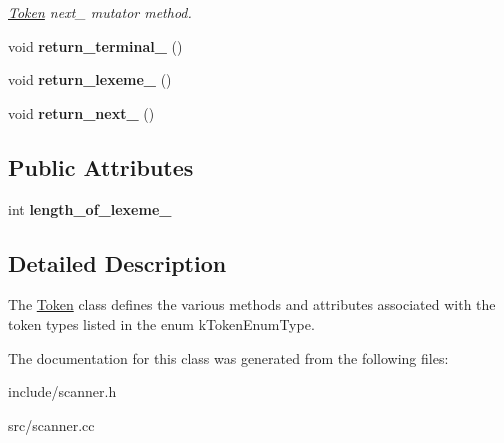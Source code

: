\begin{DoxyCompactItemize}
\begin{DoxyCompactList}\small\item\em \hyperlink{classfcal_1_1scanner_1_1Token}{Token} next\+\_\+ mutator method. \end{DoxyCompactList}\item 
void {\bfseries return\+\_\+terminal\+\_\+} ()\hypertarget{classfcal_1_1scanner_1_1Token_a38514194b1114bde6752a5de34b7a8ce}{}\label{classfcal_1_1scanner_1_1Token_a38514194b1114bde6752a5de34b7a8ce}

\item 
void {\bfseries return\+\_\+lexeme\+\_\+} ()\hypertarget{classfcal_1_1scanner_1_1Token_ad28333fbaaf84bc18edcd13780b535f5}{}\label{classfcal_1_1scanner_1_1Token_ad28333fbaaf84bc18edcd13780b535f5}

\item 
void {\bfseries return\+\_\+next\+\_\+} ()\hypertarget{classfcal_1_1scanner_1_1Token_ab3b4163def2fe6eb7424cd1e639b680f}{}\label{classfcal_1_1scanner_1_1Token_ab3b4163def2fe6eb7424cd1e639b680f}

\end{DoxyCompactItemize}
\subsection*{Public Attributes}
\begin{DoxyCompactItemize}
\item 
int {\bfseries length\+\_\+of\+\_\+lexeme\+\_\+}\hypertarget{classfcal_1_1scanner_1_1Token_a05f4953cc69eb7441b0e18095a862630}{}\label{classfcal_1_1scanner_1_1Token_a05f4953cc69eb7441b0e18095a862630}

\end{DoxyCompactItemize}


\subsection{Detailed Description}
The \hyperlink{classfcal_1_1scanner_1_1Token}{Token} class defines the various methods and attributes associated with the token types listed in the enum k\+Token\+Enum\+Type. 

The documentation for this class was generated from the following files\+:\begin{DoxyCompactItemize}
\item 
include/scanner.\+h\item 
src/scanner.\+cc\end{DoxyCompactItemize}
